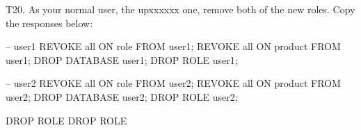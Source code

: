 T20. As your normal user, the upxxxxxx one, remove both of the new roles. Copy the responses below:
\begin{sql}
-- user1
REVOKE all ON role FROM user1;
REVOKE all ON product FROM user1;
DROP DATABASE user1;
DROP ROLE user1;

-- user2
REVOKE all ON role FROM user2;
REVOKE all ON product FROM user2;
DROP DATABASE user2;
DROP ROLE user2;
\end{sql}
\begin{pseudo}
DROP ROLE
DROP ROLE
\end{pseudo}